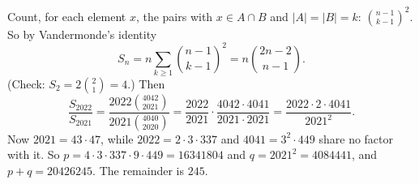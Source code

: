 Count, for each element $x$, the pairs with $x\in A\cap B$ and $|A|=|B|=k$: $\binom{n-1}{k-1}^2$. So by Vandermonde's identity
\[S_n=n\sum_{k\ge1}\binom{n-1}{k-1}^2=n\binom{2n-2}{n-1}.\]
(Check: $S_2=2\binom21=4$.) Then
\[\dfrac{S_{2022}}{S_{2021}}=\dfrac{2022\binom{4042}{2021}}{2021\binom{4040}{2020}}=\dfrac{2022}{2021}\cdot\dfrac{4042\cdot4041}{2021\cdot2021}=\dfrac{2022\cdot2\cdot4041}{2021^2}.\]
Now $2021=43\cdot47$, while $2022=2\cdot3\cdot337$ and $4041=3^2\cdot449$ share no factor with it. So $p=4\cdot3\cdot337\cdot9\cdot449=16341804$ and $q=2021^2=4084441$, and $p+q=20426245$. The remainder is $\boxed{245}$.
